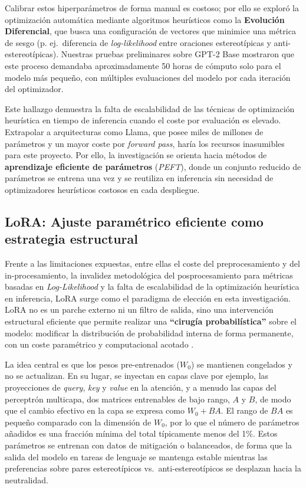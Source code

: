 \documentclass[12pt,a4paper]{report}
\begin{document}
Calibrar estos hiperparámetros de forma manual es costoso; por ello se exploró la optimización automática mediante algoritmos heurísticos como la \textbf{Evolución Diferencial}, que busca una configuración de vectores que minimice una métrica de sesgo (p. ej.\ diferencia de \textit{log-likelihood} entre oraciones estereotípicas y anti-estereotípicas). Nuestras pruebas preliminares sobre GPT-2 Base mostraron que este proceso demandaba aproximadamente 50 horas de cómputo solo para el modelo más pequeño, con múltiples evaluaciones del modelo por cada iteración del optimizador.

Este hallazgo demuestra la falta de escalabilidad de las técnicas de optimización heurística en tiempo de inferencia cuando el coste por evaluación es elevado. Extrapolar a arquitecturas como Llama, que posee miles de millones de parámetros y un mayor coste por \textit{forward pass}, haría los recursos inasumibles para este proyecto. Por ello, la investigación se orienta hacia métodos de \textbf{aprendizaje eficiente de parámetros} (\textit{PEFT}), donde un conjunto reducido de parámetros se entrena una vez y se reutiliza en inferencia sin necesidad de optimizadores heurísticos costosos en cada despliegue.

\subsection{LoRA: Ajuste paramétrico eficiente como estrategia estructural}
\label{subsec:transicion_lora}

Frente a las limitaciones expuestas, entre ellas el coste del preprocesamiento y del in-procesamiento, la invalidez metodológica del posprocesamiento para métricas basadas en \textit{Log-Likelihood} y la falta de escalabilidad de la optimización heurística en inferencia, LoRA surge como el paradigma de elección en esta investigación. LoRA no es un parche externo ni un filtro de salida, sino una intervención estructural eficiente que permite realizar una \textbf{``cirugía probabilística''} sobre el modelo: modificar la distribución de probabilidad interna de forma permanente, con un coste paramétrico y computacional acotado \cite{hu_lora_2021, raza_developing_2025}.

La idea central es que los pesos pre-entrenados ($W_0$) se mantienen congelados y no se actualizan. En su lugar, se inyectan en capas clave por ejemplo, las proyecciones de 
\textit{query}, \textit{key} y \textit{value} en la atención, y a menudo las capas del perceptrón multicapa, dos matrices entrenables de bajo rango, $A$ y $B$, de modo que 
el cambio efectivo en la capa se expresa como $W_0 + BA$. El rango de $BA$ es pequeño comparado con la dimensión de $W_0$, por lo que el número de parámetros añadidos es una 
fracción mínima del total típicamente menos del 1\%. Estos parámetros se entrenan con datos de mitigación o balanceados, de forma que la salida del modelo en tareas de lenguaje 
se mantenga estable mientras las preferencias sobre pares estereotípicos vs.\ anti-estereotípicos se desplazan hacia la neutralidad.
\end{document}
